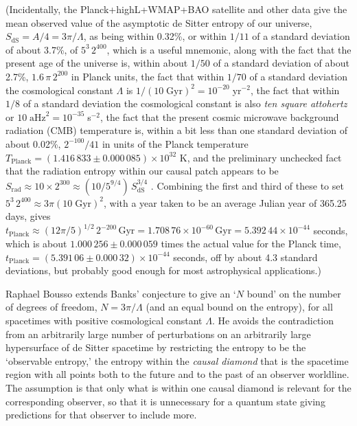 \documentclass[12pt]{article}
\begin{document}
(Incidentally, the Planck+highL+WMAP+BAO satellite and other data \cite{Ade:2013zuv} give the mean observed value of the asymptotic de Sitter entropy of our universe, $S_\mathrm{dS} = A/4 = 3\pi/\Lambda$, as being within 0.32\%, or within $1/11$ of a standard deviation of about 3.7\%, of $5^3\, 2^{400}$, which is a useful mnemonic, along with the fact that the present age of the universe is, within about $1/50$ of a standard deviation of about 2.7\%, $1.6\,\pi\, 2^{200}$ in Planck units, the fact that within $1/70$ of a standard deviation the cosmological constant $\Lambda$ is $1/(10\;{\mathrm{Gyr}})^2 = 10^{-20}\;$yr$^{-2}$, the fact that within $1/8$ of a standard deviation the cosmological constant is also {\it ten square attohertz} or $10\;\mathrm{aHz}^2 = 10^{-35}\;$s$^{-2}$, the fact that the present cosmic microwave background radiation (CMB) temperature is, within a bit less than one standard deviation of about 0.02\%, $2^{-100}/41$ in units of the Planck temperature $T_\mathrm{Planck} = (1.416\,833 \pm 0.000\,085)\times 10^{32}$ K, and the preliminary unchecked fact that the radiation entropy within our causal patch appears to be $S_\mathrm{rad} \approx 10 \times 2^{300} \approx (10/5^{9/4})\, S_\mathrm{dS}^{3/4}$ \cite{Scott:2013oib}.  Combining the first and third of these to set $5^3\, 2^{400} \approx 3\pi (10\;\mathrm{Gyr})^2$, with a year taken to be an average Julian year of 365.25 days, gives $t_\mathrm{Planck} \approx (12\pi/5)^{1/2}\, 2^{-200}\,\mathrm{Gyr} = 1.708\,76 \times 10^{-60}\,\mathrm{Gyr} = 5.392\,44 \times 10^{-44}$ seconds, which is about $1.000\,256 \pm 0.000\,059$ times the actual value for the Planck time, $t_\mathrm{Planck} = (5.391\,06 \pm 0.000\,32) \times 10^{-44}$ seconds, off by about 4.3 standard deviations, but probably good enough for most astrophysical applications.)

Raphael Bousso \cite{Bousso:2000nf} extends Banks' conjecture to give an `$N$ bound' on the number of degrees of freedom, $N = 3\pi/\Lambda$ (and an equal bound on the entropy), for all spacetimes with positive cosmological constant $\Lambda$.  He avoids the contradiction from an arbitrarily large number of perturbations on an arbitrarily large hypersurface of de Sitter spacetime by restricting the entropy to be the `observable entropy,' the entropy within the {\it causal diamond} that is the spacetime region with all points both to the future and to the past of an observer worldline.  The assumption is that only what is within one causal diamond is relevant for the corresponding observer, so that it is unnecessary for a quantum state giving predictions for that observer to include more.
\end{document}

